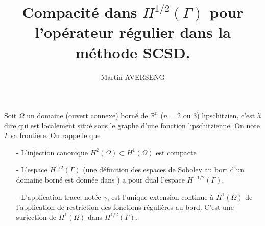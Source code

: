 \documentclass[11pt,a4paper]{article}
\author{Martin AVERSENG}
\title{Compacité dans $H^{1/2}(\Gamma)$ pour l'opérateur régulier dans la méthode SCSD.}
\begin{document}
\maketitle
\section*{}
Soit $\Omega$ un domaine (ouvert connexe) borné de $\mathbb{R}^n$ ($n=2$ ou $3$) lipschitzien, c'est à dire qui est localement situé sous le graphe d'une fonction lipschitzienne. On note $\Gamma$ sa frontière. On rappelle que 
\begin{itemize}
\item[-] L'injection canonique $H^2(\Omega) \subset H^1(\Omega)$ est compacte
\item[-] L'espace $H^{1/2}(\Gamma)$ (une définition des espaces de Sobolev au bort d'un domaine borné est donnée dans \cite[Chapitre 1, p.~20]{grisvard2011elliptic}) a pour dual l'espace $H^{-1/2}(\Gamma)$. 
\item[-] L'application trace, notée $\gamma$, est l'unique extension continue à $H^1(\Omega)$ de l'application de restriction des fonctions régulières au bord. C'est une surjection de $H^1(\Omega)$ dans $H^{1/2}(\Gamma)$.  
\end{itemize}
\end{document}
